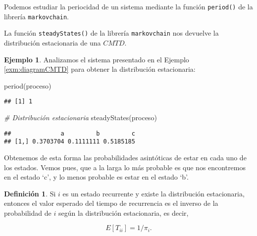 \documentclass[
]{book}
\newenvironment{Shaded}{\begin{snugshade}}{\end{snugshade}}
\newcommand{\CommentTok}[1]{\textcolor[rgb]{0.56,0.35,0.01}{\textit{#1}}}
\newcommand{\FunctionTok}[1]{\textcolor[rgb]{0.00,0.00,0.00}{#1}}
\newcommand{\NormalTok}[1]{#1}
\newenvironment{yellowbox}{
  \definecolor{shadecolor}{rgb}{210, 180, 140}  
  \color{black}
  \begin{shaded}}
 {\end{shaded}}
\newenvironment{whitebox}{
  \definecolor{shadecolor}{rgb}{255, 255, 255}  
  \color{black}
  \begin{shaded}}
 {\end{shaded}}
\theoremstyle{definition}
\newtheorem{definition}{Definición}[chapter]
\theoremstyle{definition}
\newtheorem{example}{Ejemplo}[chapter]
\theoremstyle{definition}
\theoremstyle{definition}
\theoremstyle{remark}
\begin{document}
\begin{whitebox}
Podemos estudiar la periocidad de un sistema mediante la función \texttt{period()} de la librería \texttt{markovchain}.

La función \texttt{steadyStates()} de la librería \texttt{markovchain} nos devuelve la distribución estacionaria de una \(CMTD\).

\end{whitebox}

\begin{example}
Analizamos el sistema presentado en el Ejemplo \ref{exm:diagramCMTD} para obtener la distribución estacionaria:

\begin{Shaded}
\begin{Highlighting}[]
\FunctionTok{period}\NormalTok{(proceso)}
\end{Highlighting}
\end{Shaded}

\begin{verbatim}
## [1] 1
\end{verbatim}

\begin{Shaded}
\begin{Highlighting}[]
\CommentTok{\# Distribución estacionaria}
\FunctionTok{steadyStates}\NormalTok{(proceso)}
\end{Highlighting}
\end{Shaded}

\begin{verbatim}
##              a         b         c
## [1,] 0.3703704 0.1111111 0.5185185
\end{verbatim}

Obtenemos de esta forma las probabilidades asintóticas de estar en cada uno de los estados. Vemos pues, que a la larga lo más probable es que nos encontremos en el estado `c', y lo menos probable es estar en el estado `b'.
\end{example}

\begin{yellowbox}

\begin{definition}

Si \(i\) es un estado recurrente y existe la distribución estacionaria, entonces el valor esperado del tiempo de recurrencia es el inverso de la probabilidad de \(i\) según la distribución estacionaria, es decir,

\begin{equation}
E[T_{ii}] = 1/\pi_i.
\label{eq:et-piestacionaria}
\end{equation}

\end{definition}

\end{yellowbox}
\end{document}
